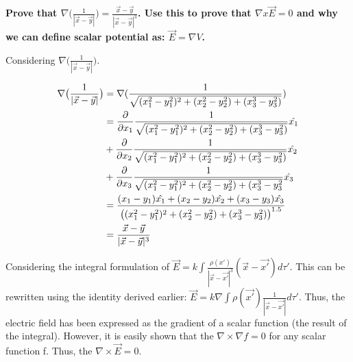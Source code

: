 \begin{homeworkProblem}

\textbf{Prove that $\nabla \big( \frac{1}{|\vec{x}-\vec{y}|}\big) = \frac{\vec{x}-\vec{y}}{|\vec{x}-\vec{y}|^3}$. Use this to prove that $\nabla x \vec{E} = 0$ and why we can define scalar potential as: $\vec{E} = \nabla V$.}

Considering $\nabla \big( \frac{1}{|\vec{x}-\vec{y}|}\big)$.

\begin{align}
\nabla \big( \frac{1}{|\vec{x}-\vec{y}|}\big) &= \nabla( \frac{1}{\sqrt{(x_1^2-y_1^2)^2+(x_2^2-y_2^2)+(x_3^3-y_3^2)}} ) \nonumber \\
&= \dfrac{\partial}{\partial x_1}  \frac{1}{\sqrt{(x_1^2-y_1^2)^2+(x_2^2-y_2^2)+(x_3^3-y_3^2)}}\hat{x_1} \nonumber \\ & + \dfrac{\partial}{\partial x_2}\frac{1}{\sqrt{(x_1^2-y_1^2)^2+(x_2^2-y_2^2)+(x_3^3-y_3^2)}}\hat{x_2} \nonumber \\ &+ \dfrac{\partial}{\partial x_3}  \frac{1}{\sqrt{(x_1^2-y_1^2)^2+(x_2^2-y_2^2)+(x_3^3-y_3^2}}\hat{x_3} \nonumber \\
&= \frac{(x_1 - y_1)\hat{x_1} + (x_2 - y_2) \hat{x_2} + (x_3 - y_3) \hat{x_3}}{\big((x_1^2-y_1^2)^2+(x_2^2-y_2^2)+(x_3^3-y_3^2)\big)^{1.5}} \nonumber \\
&= \frac{\vec{x}-\vec{y}}{|\vec{x}-\vec{y}|^3} \nonumber
\end{align}

Considering the integral formulation of $\vec{E} = k \int \frac{\rho(x')}{|\vec{x}-\vec{x'}|^3}(\vec{x}-\vec{x'})d\tau'$. This can be rewritten using the identity derived earlier: $\vec{E} = k \nabla \int \rho(\vec{x'})\frac{1}{|\vec{x}-\vec{x'}|} d\tau'$. Thus, the electric field has been expressed as the gradient of a scalar function (the result of the integral). However, it is easily shown that the $\nabla \times \nabla f = 0$ for any scalar function f. Thus, the $\nabla \times \vec{E} = 0$.

\end{homeworkProblem}